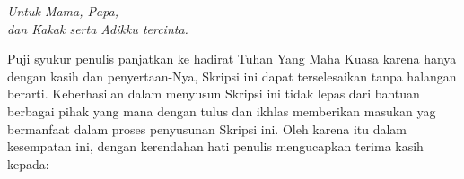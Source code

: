 \documentclass{jtetiskripsi}
\begin{document}
\cover



\acknowledgment
\begin{flushright}
\emph{Untuk Mama, Papa,\\dan Kakak serta Adikku tercinta.}
\end{flushright}
\preface

Puji syukur penulis panjatkan ke hadirat Tuhan Yang Maha Kuasa karena hanya dengan kasih dan penyertaan-Nya, Skripsi ini dapat terselesaikan tanpa halangan berarti. Keberhasilan dalam menyusun Skripsi ini tidak lepas dari bantuan berbagai pihak yang mana dengan tulus dan ikhlas memberikan masukan yag bermanfaat dalam proses penyusunan Skripsi ini. Oleh karena itu dalam kesempatan ini, dengan kerendahan hati penulis mengucapkan terima kasih kepada:
\end{document}
